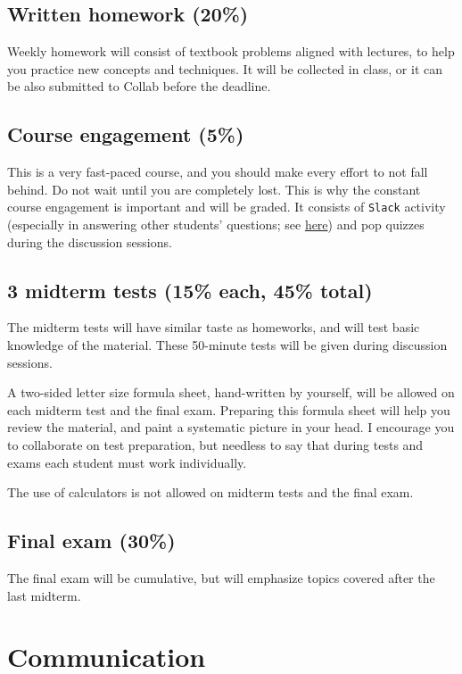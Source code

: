 \documentclass[oneside,11pt]{amsart}
\begin{document}
\subsection{Written homework (20\%)} Weekly homework will consist of textbook problems aligned with lectures, to help you practice new concepts and techniques. It will be collected in class, or it can be also submitted to Collab before the deadline.
 
\subsection{Course engagement (5\%)}

This is a very fast-paced course, and you should make every effort to not fall behind. Do not wait until you are completely lost. This is why the constant course engagement is important and will be graded. It consists of \texttt{Slack} activity (especially in answering other students' questions; see \hyperref[comm]{here}) and pop quizzes during the discussion sessions.

\subsection{3 midterm tests (15\% each, 45\% total)}

The midterm tests will have similar taste as homeworks, and will test basic knowledge of the material. These 50-minute tests will be given during discussion sessions.

A two-sided letter size formula sheet, hand-written by yourself, will be allowed on each midterm test and the final exam. Preparing this formula sheet will help you review the material, and paint a systematic picture in your head. I encourage you to collaborate on test preparation, but needless to say that during tests and exams each student must work individually.

The use of calculators is not allowed on midterm tests and the final exam.

\subsection{Final exam (30\%)}
The final exam will be cumulative, but will emphasize topics covered after the last midterm.

\section{Communication} \label{comm} 
\end{document}
